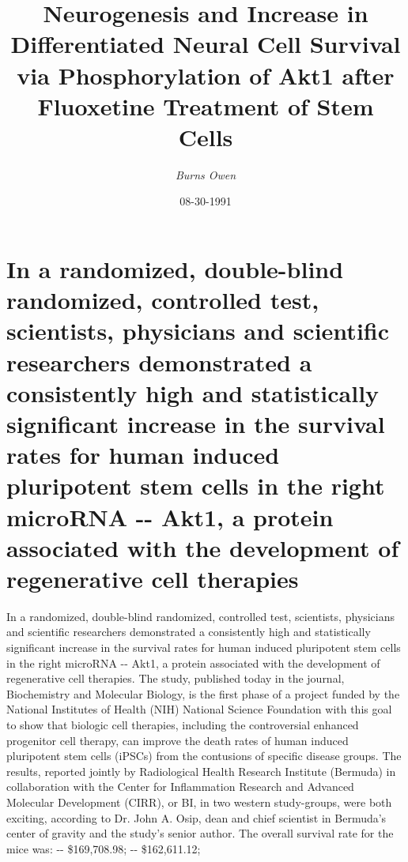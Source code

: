 \documentclass{article}%
\title{Neurogenesis and Increase in Differentiated Neural Cell Survival via Phosphorylation of Akt1 after Fluoxetine Treatment of Stem Cells}%
\author{\textit{Burns Owen}}%
\date{08-30-1991}%
\begin{document}
%
\normalsize%
\maketitle%
\section{\newline%
In a randomized, double{-}blind randomized, controlled test, scientists, physicians and scientific researchers demonstrated a consistently high and statistically significant increase in the survival rates for human induced pluripotent stem cells in the right microRNA {-}{-} Akt1, a protein associated with the development of regenerative cell therapies}%
\label{sec:Inarandomized,double{-}blindrandomized,controlledtest,scientists,physiciansandscientificresearchersdemonstratedaconsistentlyhighandstatisticallysignificantincreaseinthesurvivalratesforhumaninducedpluripotentstemcellsintherightmicroRNA{-}{-}Akt1,aproteinassociatedwiththedevelopmentofregenerativecelltherapies}%
\newline%
In a randomized, double{-}blind randomized, controlled test, scientists, physicians and scientific researchers demonstrated a consistently high and statistically significant increase in the survival rates for human induced pluripotent stem cells in the right microRNA {-}{-} Akt1, a protein associated with the development of regenerative cell therapies.\newline%
The study, published today in the journal, Biochemistry and Molecular Biology, is the first phase of a project funded by the National Institutes of Health (NIH) National Science Foundation with this goal to show that biologic cell therapies, including the controversial enhanced progenitor cell therapy, can improve the death rates of human induced pluripotent stem cells (iPSCs) from the contusions of specific disease groups.\newline%
The results, reported jointly by Radiological Health Research Institute (Bermuda) in collaboration with the Center for Inflammation Research and Advanced Molecular Development (CIRR), or BI, in two western study{-}groups, were both exciting, according to Dr. John A. Osip, dean and chief scientist in Bermuda's center of gravity and the study's senior author.\newline%
The overall survival rate for the mice was:\newline%
{-}{-} \$169,708.98;\newline%
{-}{-} \$162,611.12;\newline%
\end{document}
